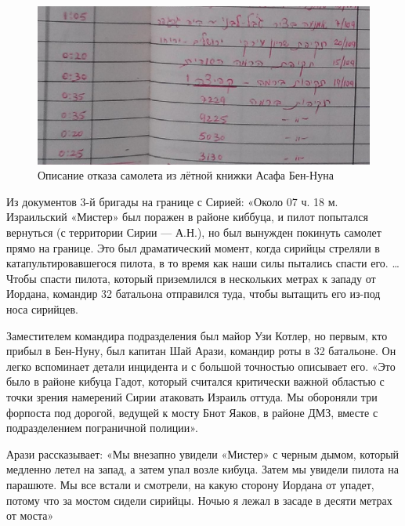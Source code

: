 \begin{figure}[h!tb] 
	\centering\includegraphics[scale=0.6]{History_BenNun/YhSu4RMbuBo.jpg}
	\caption{Описание отказа самолета из лётной книжки Асафа Бен-Нуна }%
\end{figure}

Из документов 3-й бригады на границе с Сирией: «Около 07 ч. 18 м. Израильский «Мистер» был поражен в районе киббуца, и пилот попытался вернуться (с территории Сирии — А.Н.), но был вынужден покинуть самолет прямо на границе. Это был драматический момент, когда сирийцы стреляли в катапультировавшегося пилота, в то время как наши силы пытались спасти его. … Чтобы спасти пилота, который приземлился в нескольких метрах к западу от Иордана, командир 32 батальона отправился туда, чтобы вытащить его из-под носа сирийцев.

Заместителем командира подразделения был майор Узи Котлер, но первым, кто прибыл в Бен-Нуну, был капитан Шай Арази, командир роты в 32 батальоне. Он легко вспоминает детали инцидента и с большой точностью описывает его. «Это было в районе кибуца Гадот, который считался критически важной областью с точки зрения намерений Сирии атаковать Израиль оттуда. Мы обороняли три форпоста под дорогой, ведущей к мосту Бнот Яаков, в районе ДМЗ, вместе с подразделением пограничной полиции».

Арази рассказывает: «Мы внезапно увидели «Мистер» с черным дымом, который медленно летел на запад, а затем упал возле кибуца. Затем мы увидели пилота на парашюте. Мы все встали и смотрели, на какую сторону Иордана от упадет, потому что за мостом сидели сирийцы. Ночью я лежал в засаде в десяти метрах от моста»

